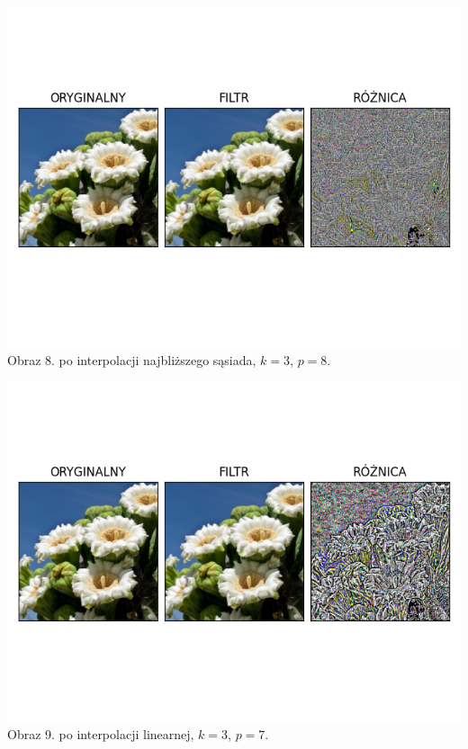 \documentclass[14pt]{article}
\begin{document}
\begin{center}
    \includegraphics[scale=0.7]{images/nn_k3_p8.png}
    \\ \small Obraz 8. po interpolacji najbliższego sąsiada, 
    $k=3$, $p=8$.

    \includegraphics[scale=0.7]{images/lin_k3_p7.png}
    \\ \small Obraz 9. po interpolacji linearnej, 
    $k=3$, $p=7$.


\end{center}
\end{document}
